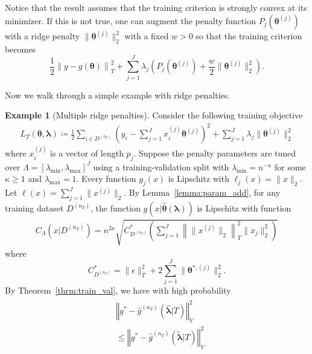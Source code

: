 \documentclass[12pt]{article} %
\theoremstyle{definition}
\newtheorem{example}{Example}
\begin{document}
Notice that the result assumes that the training criterion is strongly convex at its minimizer. If this is not true, one can augment the penalty function $P_j(\boldsymbol{\theta}^{(j)})$ with a ridge penalty $\| \boldsymbol{\theta}^{(j)} \|_2^2$ with a fixed $w > 0$ so that the training criterion becomes
\begin{equation}
\label{eq:param_add_models_ridge}
\frac{1}{2} \left  \| y -  g(\boldsymbol{\theta}) \right \|^2_T 
+ \sum_{j=1}^J \lambda_j \left ( P_j(\boldsymbol{\theta}^{(j)}) + \frac{w}{2} \| \boldsymbol{\theta}^{(j)} \|^2_2 \right ).
\end{equation}

Now we walk through a simple example with ridge penalties.
\begin{example}[Multiple ridge penalties]
	Consider the following training objective
	\begin{align}
	L_T \left (\boldsymbol{\theta}, \boldsymbol{\lambda} \right) 
	\coloneqq 
	\frac{1}{2}
	\sum_{i\in D^{(n_T)}}
	\left(y_i -  \sum_{j=1}^J x_{i}^{(j)} \boldsymbol{\theta}^{(j)} \right )^2
	+ \sum_{j=1}^J \lambda_j \|\boldsymbol{\theta}^{(j)}\|_2^2
	\end{align}
	where $x_{i}^{(j)}$ is a vector of length $p_j$.
	Suppose the penalty parameters are tuned over $\Lambda = \left [ \lambda_{\min}, \lambda_{\max} \right ]^J$ using a training-validation split with $\lambda_{\min} = n^{-\kappa}$ for some $\kappa \ge 1$ and $\lambda_{\max} = 1$.
	Every function $g_j(x)$ is Lipschitz with $\ell_j(x) = \|x\|_2$.
	Let $\ell(x) = \sum_{j=1}^J \|x^{(j)}\|_2$.
	By Lemma~\ref{lemma:param_add}, for any training dataset $D^{(n_T)}$, the function $g(x | \hat{\boldsymbol{\theta}}(\boldsymbol{\lambda}))$ is Lipschitz with function
	\begin{align}
	C_\Lambda \left ( x | D^{(n_T)} \right ) =
	n^{2\kappa}
	\sqrt{
		C^*_{D^{(n_T)}}
		\left(
		\sum_{j = 1}^J \left \|\|x^{(j)} \|_2 \right \|_T^2 \|x_j\|_2^2
		\right)
	}
	\end{align}
	where $$
	C^*_{D^{(n_T)}} = 
	\|\epsilon\|_{T}^{2}
	+2\sum_{j=1}^J \|\boldsymbol{\theta}^{*,(j)}\|_2^2
	.$$
	By Theorem~\ref{thrm:train_val}, we have with high probability
	\begin{align}
	\begin{split}
	& \left\Vert g^* - \hat{g}^{(n_T)}( \hat{\boldsymbol{\lambda}} | T) \right\Vert _{V}^2 \\
	&\le \left\Vert g^* - \hat{g}^{(n_T)}( \tilde{\boldsymbol{\lambda}} | T) \right \Vert^2_{V}\\

\end{split}
\end{align}
\end{example}
\end{document}

